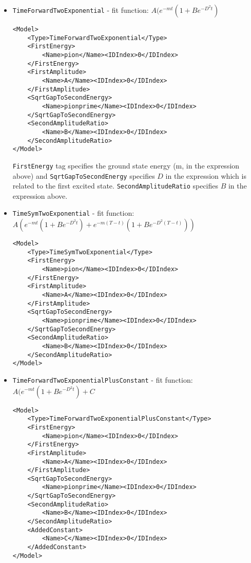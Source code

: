 \documentclass[12pt]{article}
\newcommand{\vb}{\texttt}
\begin{document}
\begin{itemize}
\item \vb{TimeForwardTwoExponential} - fit function:
  $A(e^{-mt}(1 + B e^{-D^2t})$
\begin{verbatim}
<Model>
    <Type>TimeForwardTwoExponential</Type>
    <FirstEnergy>
        <Name>pion</Name><IDIndex>0</IDIndex>
    </FirstEnergy>
    <FirstAmplitude>
        <Name>A</Name><IDIndex>0</IDIndex>
    </FirstAmplitude>
    <SqrtGapToSecondEnergy>
        <Name>pionprime</Name><IDIndex>0</IDIndex>
    </SqrtGapToSecondEnergy>
    <SecondAmplitudeRatio>
        <Name>B</Name><IDIndex>0</IDIndex>
    </SecondAmplitudeRatio>
</Model>
\end{verbatim}

\vb{FirstEnergy} tag specifies the ground state energy (m, in the expression above) and
\vb{SqrtGapToSecondEnergy} specifies $D$ in the expression which is related to the first excited state.
\vb{SecondAmplitudeRatio} specifies $B$ in the expression above.

\item \vb{TimeSymTwoExponential} - fit function:
  $A(e^{-mt}(1 + B e^{-D^2t}) + e^{-m(T-t)}(1 + B e^{-D^2(T-t)}))$
\begin{verbatim}
<Model>
    <Type>TimeSymTwoExponential</Type>
    <FirstEnergy>
        <Name>pion</Name><IDIndex>0</IDIndex>
    </FirstEnergy>
    <FirstAmplitude>
        <Name>A</Name><IDIndex>0</IDIndex>
    </FirstAmplitude>
    <SqrtGapToSecondEnergy>
        <Name>pionprime</Name><IDIndex>0</IDIndex>
    </SqrtGapToSecondEnergy>
    <SecondAmplitudeRatio>
        <Name>B</Name><IDIndex>0</IDIndex>
    </SecondAmplitudeRatio>
</Model>
\end{verbatim}

\item \vb{TimeForwardTwoExponentialPlusConstant} - fit function:
  $A(e^{-mt}(1 + B e^{-D^2t}) + C$
\begin{verbatim}
<Model>
    <Type>TimeForwardTwoExponentialPlusConstant</Type>
    <FirstEnergy>
        <Name>pion</Name><IDIndex>0</IDIndex>
    </FirstEnergy>
    <FirstAmplitude>
        <Name>A</Name><IDIndex>0</IDIndex>
    </FirstAmplitude>
    <SqrtGapToSecondEnergy>
        <Name>pionprime</Name><IDIndex>0</IDIndex>
    </SqrtGapToSecondEnergy>
    <SecondAmplitudeRatio>
        <Name>B</Name><IDIndex>0</IDIndex>
    </SecondAmplitudeRatio>
    <AddedConstant>
        <Name>C</Name><IDIndex>0</IDIndex>
    </AddedConstant>
</Model>
\end{verbatim}


\end{itemize}
\end{document}
